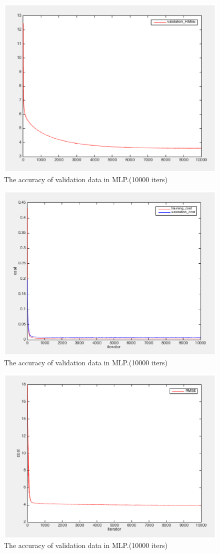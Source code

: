 \documentclass[10pt,twocolumn,letterpaper]{article}
\begin{document}
\begin{figure}[htbp]
\centering
\includegraphics[width=0.8\linewidth]{MLP_RMSE.eps}
\caption{The accuracy of validation data in MLP.(10000 iters)}
\label{fig:long}
\label{fig:onecol}
\end{figure}

\begin{figure}[htbp]
\centering
\includegraphics[width=0.8\linewidth]{mlp_dropout_cost.eps}
\caption{The accuracy of validation data in MLP.(10000 iters)}
\label{fig:long}
\label{fig:onecol}
\end{figure}

\begin{figure}[htbp]
\centering
\includegraphics[width=0.8\linewidth]{mlp_dropout_rmse.eps}
\caption{The accuracy of validation data in MLP.(10000 iters)}
\label{fig:long}
\label{fig:onecol}
\end{figure}
\end{document}
